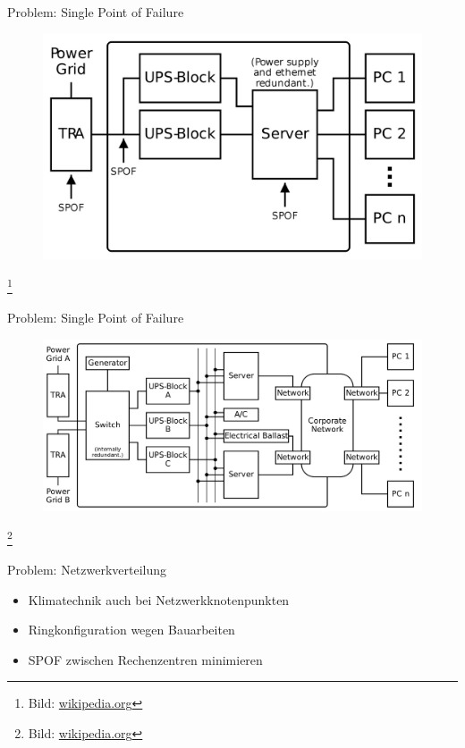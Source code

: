 \documentclass[10pt]{beamer}
\newcommand\blfootnote[1]{%
	\begingroup
	\renewcommand\thefootnote{}\footnote{#1}%
	\addtocounter{footnote}{-1}%
	\endgroup
}
\begin{document}
\begin{frame}[fragile]{Problem: Single Point of Failure}
\begin{figure}
	\includegraphics[width=1\textwidth]{images/spof2}
\end{figure}
\blfootnote{Bild: \href{https://de.wikipedia.org/wiki/Single_Point_of_Failure}{wikipedia.org}}
\end{frame}

\begin{frame}[fragile]{Problem: Single Point of Failure}
\begin{figure}
	\includegraphics[width=1\textwidth]{images/spof3}
\end{figure}
\blfootnote{Bild: \href{https://de.wikipedia.org/wiki/Single_Point_of_Failure}{wikipedia.org}}
\end{frame}

%
%
\begin{frame}[fragile]{Problem: Netzwerkverteilung}
	\begin{itemize}
	\item Klimatechnik auch bei Netzwerkknotenpunkten
	\item Ringkonfiguration wegen Bauarbeiten
	\item SPOF zwischen Rechenzentren minimieren
\end{itemize}
\end{frame}
\end{document}
